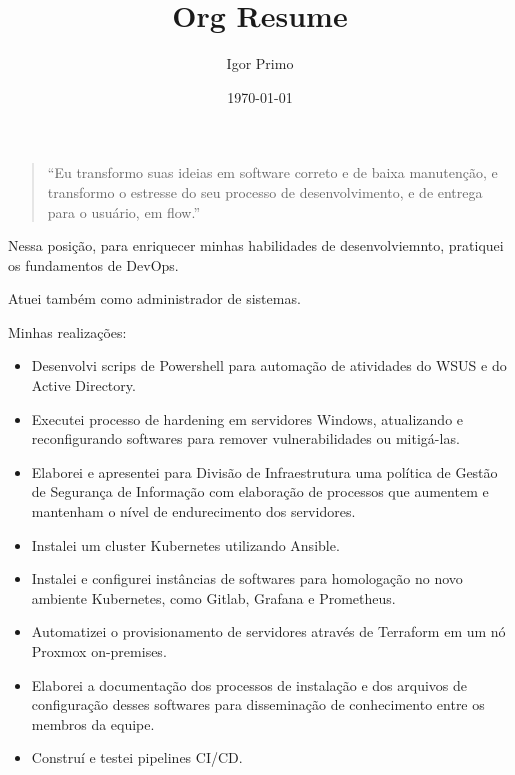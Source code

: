 \documentclass[10pt,a4paper,ragged2e,withhyper]{altacv}
\author{Igor Primo}
\date{\today}
\title{Org Resume}
\begin{document}
\makecvheader
\begin{paracol}{2}
\begin{quote}
 ``Eu transformo suas ideias em software correto e de baixa manutenção, e transformo o estresse do seu processo de desenvolvimento, e de entrega para o usuário, em flow.''
\end{quote}
\label{sec:org3ecf558}

Nessa posição, para enriquecer minhas habilidades de desenvolviemnto, pratiquei os fundamentos de DevOps.

Atuei também como administrador de sistemas.

Minhas realizações:
\begin{itemize}
\item Desenvolvi scrips de Powershell para automação de atividades do WSUS e do Active Directory.
\item Executei processo de hardening em servidores Windows, atualizando e reconfigurando softwares para remover vulnerabilidades ou mitigá-las.
\item Elaborei e apresentei para Divisão de Infraestrutura uma política de Gestão de Segurança de Informação com elaboração de processos que aumentem e mantenham o nível de endurecimento dos servidores.
\item Instalei um cluster Kubernetes utilizando Ansible.
\item Instalei e configurei instâncias de softwares para homologação no novo ambiente Kubernetes, como Gitlab, Grafana e Prometheus.
\item Automatizei o provisionamento de servidores através de Terraform em um nó Proxmox on-premises.
\item Elaborei a documentação dos processos de instalação e dos arquivos de configuração desses softwares para disseminação de conhecimento entre os membros da equipe.
\item Construí e testei pipelines CI/CD.
\end{itemize}



\end{paracol}
\end{document}
